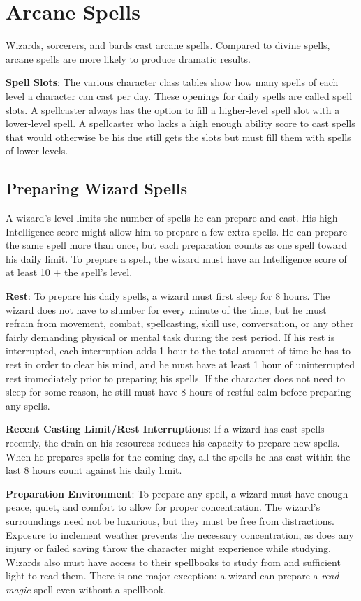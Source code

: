 \section{Arcane Spells}

				
Wizards, sorcerers, and bards cast arcane spells. Compared to divine spells, arcane spells are more likely to produce dramatic results.
				
\textbf{Spell Slots}: The various character class tables show how many spells of each level a character can cast per day. These openings for daily spells are called spell slots. A spellcaster always has the option to fill a higher-level spell slot with a lower-level spell. A spellcaster who lacks a high enough ability score to cast spells that would otherwise be his due still gets the slots but must fill them with spells of lower levels.
				
\subsection{Preparing Wizard Spells}

				
A wizard's level limits the number of spells he can prepare and cast. His high Intelligence score might allow him to prepare a few extra spells. He can prepare the same spell more than once, but each preparation counts as one spell toward his daily limit. To prepare a spell, the wizard must have an Intelligence score of at least 10 + the spell's level.
				
\textbf{Rest}: To prepare his daily spells, a wizard must first sleep for 8 hours. The wizard does not have to slumber for every minute of the time, but he must refrain from movement, combat, spellcasting, skill use, conversation, or any other fairly demanding physical or mental task during the rest period. If his rest is interrupted, each interruption adds 1 hour to the total amount of time he has to rest in order to clear his mind, and he must have at least 1 hour of uninterrupted rest immediately prior to preparing his spells. If the character does not need to sleep for some reason, he still must have 8 hours of restful calm before preparing any spells. 
				
\textbf{Recent Casting Limit/Rest Interruptions}: If a wizard has cast spells recently, the drain on his resources reduces his capacity to prepare new spells. When he prepares spells for the coming day, all the spells he has cast within the last 8 hours count against his daily limit.
				
\textbf{Preparation Environment}: To prepare any spell, a wizard must have enough peace, quiet, and comfort to allow for proper concentration. The wizard's surroundings need not be luxurious, but they must be free from distractions. Exposure to inclement weather prevents the necessary concentration, as does any injury or failed saving throw the character might experience while studying. Wizards also must have access to their spellbooks to study from and sufficient light to read them. There is one major exception: a wizard can prepare a \textit{read magic }spell even without a spellbook. 
				
